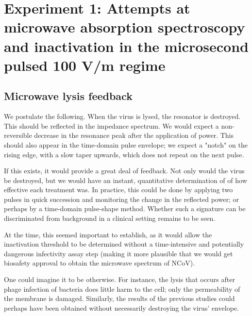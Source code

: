 \documentclass[paper.tex]{subfiles}
\begin{document}
\section{Experiment 1: Attempts at microwave absorption spectroscopy and inactivation in the microsecond pulsed 100 V/m regime}


\subsection{Microwave lysis feedback}

We postulate the following. When the virus is lysed, the resonator is destroyed. This should be reflected in the impedance spectrum.
We would expect a non-reversible decrease in the resonance peak after the application of power. This should also appear in the time-domain pulse envelope; we expect a "notch" on the rising edge, with a slow taper upwards, which does not repeat on the next pulse.

If this exists, it would provide a great deal of feedback. Not only would the virus be destroyed, but we would have an instant, quantitative determination of of how effective each treatment was. In practice, this could be done by applying two pulses in quick succession and monitoring the change in the reflected power; or perhaps by a time-domain pulse-shape method. Whether such a signature can be discriminated from background in a clinical setting remains to be seen.

At the time, this seemed important to establish, as it would allow the inactivation threshold to be determined without a time-intensive and potentially dangerous infectivity assay step (making it more plausible that we would get biosafety approval to obtain the microwave spectrum of NCoV). 

One could imagine it to be otherwise. For instance, the lysis that occurs after phage infection of bacteria does little harm to the cell; only the permeability of the membrane is damaged\cite{GROWTH}. Similarly, the results of the previous studies could perhaps have been obtained without necessarily destroying the virus' envelope.
\end{document}
